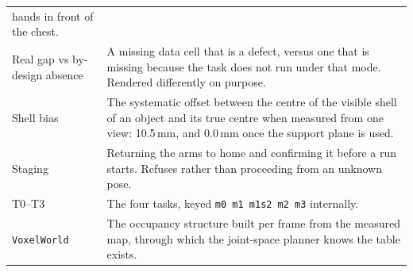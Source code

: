\documentclass[11pt,a4paper,oneside]{report}
\newcommand{\code}[1]{\texttt{\small #1}}
\begin{document}
\begin{longtable}{@{}p{}p{}@{}}
hands in front of the chest. \\
Real gap vs by-design absence & A missing data cell that is a defect, versus one
that is missing because the task does not run under that mode. Rendered
differently on purpose. \\
Shell bias & The systematic offset between the centre of the visible shell of
an object and its true centre when measured from one view: 10.5\,mm, and 0.0\,mm
once the support plane is used. \\
Staging & Returning the arms to home and confirming it before a run starts.
Refuses rather than proceeding from an unknown pose. \\
T0--T3 & The four tasks, keyed \code{m0 m1 m1s2 m2 m3} internally. \\
\code{VoxelWorld} & The occupancy structure built per frame from the measured
map, through which the joint-space planner knows the table exists. \\
\bottomrule
\end{longtable}
\end{document}
